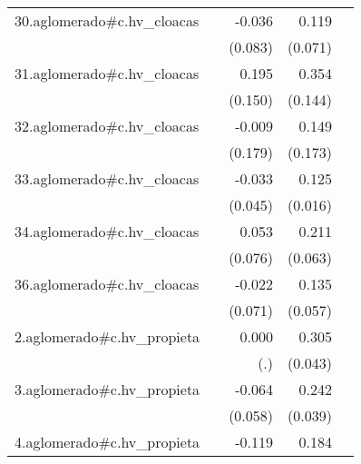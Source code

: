 {\begin{longtable}{l*{4}{D{.}{.}{-1}}}
\addlinespace
30.aglomerado#c.hv\_cloacas&                     &      -0.036         &       0.119         &                     \\
            &                     &     (0.083)         &     (0.071)         &                     \\
\addlinespace
31.aglomerado#c.hv\_cloacas&                     &       0.195         &       0.354\sym{*}  &                     \\
            &                     &     (0.150)         &     (0.144)         &                     \\
\addlinespace
32.aglomerado#c.hv\_cloacas&                     &      -0.009         &       0.149         &                     \\
            &                     &     (0.179)         &     (0.173)         &                     \\
\addlinespace
33.aglomerado#c.hv\_cloacas&                     &      -0.033         &       0.125\sym{***}&                     \\
            &                     &     (0.045)         &     (0.016)         &                     \\
\addlinespace
34.aglomerado#c.hv\_cloacas&                     &       0.053         &       0.211\sym{***}&                     \\
            &                     &     (0.076)         &     (0.063)         &                     \\
\addlinespace
36.aglomerado#c.hv\_cloacas&                     &      -0.022         &       0.135\sym{*}  &                     \\
            &                     &     (0.071)         &     (0.057)         &                     \\
\addlinespace
2.aglomerado#c.hv\_propieta&                     &       0.000         &       0.305\sym{***}&                     \\
            &                     &         (.)         &     (0.043)         &                     \\
\addlinespace
3.aglomerado#c.hv\_propieta&                     &      -0.064         &       0.242\sym{***}&                     \\
            &                     &     (0.058)         &     (0.039)         &                     \\
\addlinespace
4.aglomerado#c.hv\_propieta&                     &      -0.119\sym{*}  &       0.184\sym{***}&                     \\

\end{longtable}}
